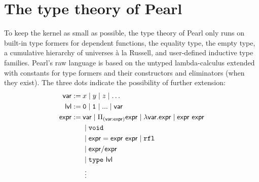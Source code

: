 \documentclass[a4paper]{article}
\begin{document}





\section{The type theory of Pearl} \label{sec:typetheory}


To keep the kernel as small as possible, the type theory of Pearl only runs on built-in type formers for dependent functions, the equality type, the empty type, a cumulative hierarchy of universes à la Russell, and user-defined inductive type families. Pearl's raw language is based on the untyped lambda-calculus extended with constants for type formers and their constructors and eliminators (when they exist). The three dots indicate the possibility of further extension: 
\begin{align*}
	\mathsf{var} :=\:& {x} \mid {y} \mid {z} \mid \ldots \\ 
	\mathsf{lvl} :=\:& \mathtt{0} \mid \mathtt{1} \mid ... \mid \var \\ 
	\expr :=\:& \var  \mid \Pi_{(\var : \expr)} \expr \mid  \fun{\var}\expr \mid \expr\ \expr \\
	& \mid \void \\ %
	& \mid \idtype{\expr}{\expr}{\expr} \mid  \rfl \\ %
	& \mid \expr / \expr  \\
	& \mid \type \ \mathsf{lvl}  \\
	& \; \vdots
\end{align*}

%
\end{document}
